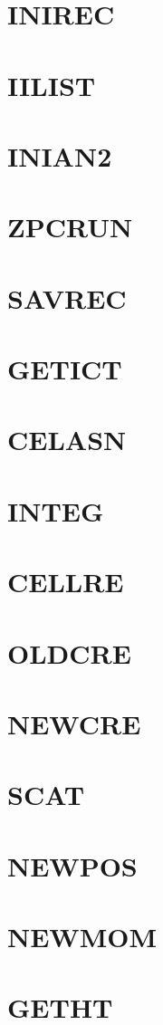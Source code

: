 \documentclass[10pt,UTF8]{ctexbook}
\begin{document}
\section{INIREC}
\section{IILIST}
\section{INIAN2}
\section{ZPCRUN}
\section{SAVREC}
\section{GETICT}
\section{CELASN}
\section{INTEG}
\section{CELLRE}
\section{OLDCRE}
\section{NEWCRE}
\section{SCAT}
\section{NEWPOS}
\section{NEWMOM}
\section{GETHT}
\end{document}
